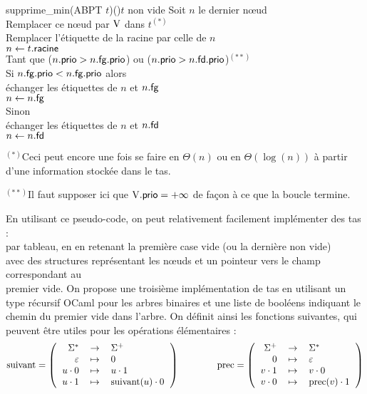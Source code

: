 			\begin{pscode}{supprime\_min}{(ABPT \(t\))}{()}{$t$ non vide}
				Soit \(n\) le dernier n\oe ud \\
				Remplacer ce n\oe ud par \(\mathrm{V}\) dans \(t\)$^{(*)}$ \\
				Remplacer l'étiquette de la racine par celle de \(n\) \\
				\(n \gets t.\text{\textsf{racine}}\) \\
				Tant que (\(n.\text{\textsf{prio}} > n.\text{\textsf{fg}}.\text{\textsf{prio}}\)) ou (\(n.\text{\textsf{prio}} > n.\text{\textsf{fd}}.\text{\textsf{prio}}\))$^{(**)}$ \\ \Indp
					Si \(n.\text{\textsf{fg}}.\text{\textsf{prio}} < n.\text{\textsf{fg}}.\text{\textsf{prio}}\) alors \\ \Indp
						échanger les étiquettes de \(n\) et \(n.\text{\textsf{fg}}\) \\
						\(n \gets n.\text{\textsf{fg}}\) \\ \Indm
					Sinon \\ \Indp
						échanger les étiquettes de \(n\) et \(n.\text{\textsf{fd}}\) \\
						\(n \gets n.\text{\textsf{fd}}\)
			\end{pscode}
			
			\begin{Remarque}
				$^{(*)}$Ceci peut encore une fois se faire en \(\Theta(n)\) ou en \(\Theta(\log(n))\) à partir d'une information stockée dans le tas.
			\end{Remarque}
			
			\begin{Remarque}
				$^{(**)}$Il faut supposer ici que \(\mathrm{V}.\text{\textsf{prio}} = +\infty\) de façon à ce que la boucle termine.
			\end{Remarque}
			
			En utilisant ce pseudo-code, on peut relativement facilement implémenter des tas : \\
				 \bdot par tableau, en en retenant la première case vide (ou la dernière non vide) \\
				 \bdot avec des structures représentant les n\oe uds et un pointeur vers le champ correspondant au \\ \listspace premier vide. \nll
			On propose une troisième implémentation de tas en utilisant un type récursif OCaml pour les arbres binaires et une liste de booléens indiquant le chemin du premier vide dans l'arbre. \nt
			\eqskip{3mm}
			On définit ainsi les fonctions suivantes, qui peuvent être utiles pour les opérations élémentaires :
				\[
					\text{suivant} = \funnn{\Sigma^*}{\Sigma^+}{\varepsilon}{0}{u\cdot 0}{u\cdot 1}{u\cdot 1}{\text{suivant}(u) \cdot 0} \qquad\qquad \text{prec} = \funnn{\Sigma^+}{\Sigma^*}{0}{\varepsilon}{v\cdot 1}{v\cdot 0}{v\cdot 0}{\text{prec}(v)\cdot 1}
				\]


